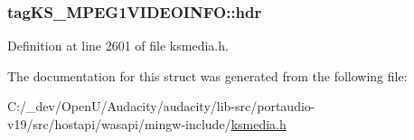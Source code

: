 \subsubsection[{\texorpdfstring{hdr}{hdr}}]{ tag\+K\+S\+\_\+\+M\+P\+E\+G1\+V\+I\+D\+E\+O\+I\+N\+F\+O\+::hdr}\hypertarget{structtag_k_s___m_p_e_g1_v_i_d_e_o_i_n_f_o_a167f2697e65b70f93a1011177fb62b3a}{}\label{structtag_k_s___m_p_e_g1_v_i_d_e_o_i_n_f_o_a167f2697e65b70f93a1011177fb62b3a}


Definition at line 2601 of file ksmedia.\+h.



The documentation for this struct was generated from the following file\+:\begin{DoxyCompactItemize}
\item 
C\+:/\+\_\+dev/\+Open\+U/\+Audacity/audacity/lib-\/src/portaudio-\/v19/src/hostapi/wasapi/mingw-\/include/\hyperlink{ksmedia_8h}{ksmedia.\+h}\end{DoxyCompactItemize}
